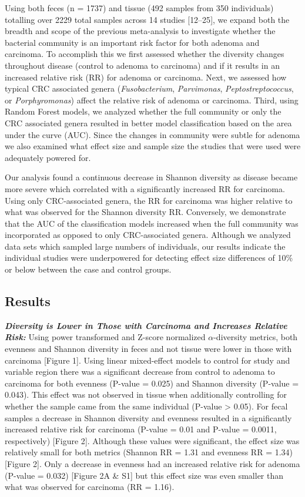 \documentclass[12pt,]{article}
\begin{document}
Using both feces (n = 1737) and tissue (492 samples from 350
individuals) totalling over 2229 total samples across 14 studies
{[}12--25{]}, we expand both the breadth and scope of the previous
meta-analysis to investigate whether the bacterial community is an
important risk factor for both adenoma and carcinoma. To accomplish this
we first assessed whether the diversity changes throughout disease
(control to adenoma to carcinoma) and if it results in an increased
relative risk (RR) for adenoma or carcinoma. Next, we assessed how
typical CRC associated genera (\emph{Fusobacterium}, \emph{Parvimonas},
\emph{Peptostreptococcus}, or \emph{Porphyromonas}) affect the relative
risk of adenoma or carcinoma. Third, using Random Forest models, we
analyzed whether the full community or only the CRC associated genera
resulted in better model classification based on the area under the
curve (AUC). Since the changes in community were subtle for adenoma we
also examined what effect size and sample size the studies that were
used were adequately powered for.

Our analysis found a continuous decrease in Shannon diversity as disease
became more severe which correlated with a significantly increased RR
for carcinoma. Using only CRC-associated genera, the RR for carcinoma
was higher relative to what was observed for the Shannon diversity RR.
Conversely, we demonstrate that the AUC of the classification models
increased when the full community was incorporated as opposed to only
CRC-associated genera. Although we analyzed data sets which sampled
large numbers of individuals, our results indicate the individual
studies were underpowered for detecting effect size differences of 10\%
or below between the case and control groups.

\newpage

\subsection{Results}\label{results}

\textbf{\emph{Diversity is Lower in Those with Carcinoma and Increases
Relative Risk:}} Using power transformed and Z-score normalized
\(\alpha\)-diversity metrics, both evenness and Shannon diversity in
feces and not tissue were lower in those with carcinoma {[}Figure 1{]}.
Using linear mixed-effect models to control for study and variable
region there was a significant decrease from control to adenoma to
carcinoma for both evenness (P-value = 0.025) and Shannon diversity
(P-value = 0.043). This effect was not observed in tissue when
additionally controlling for whether the sample came from the same
individual (P-value \textgreater{} 0.05). For fecal samples a decrease
in Shannon diversity and evenness resulted in a significantly increased
relative risk for carcinoma (P-value = 0.01 and P-value = 0.0011,
respectively) {[}Figure 2{]}. Although these values were significant,
the effect size was relatively small for both metrics (Shannon RR = 1.31
and evenness RR = 1.34) {[}Figure 2{]}. Only a decrease in evenness had
an increased relative risk for adenoma (P-value = 0.032) {[}Figure 2A \&
S1{]} but this effect size was even smaller than what was observed for
carcinoma (RR = 1.16).
\end{document}

